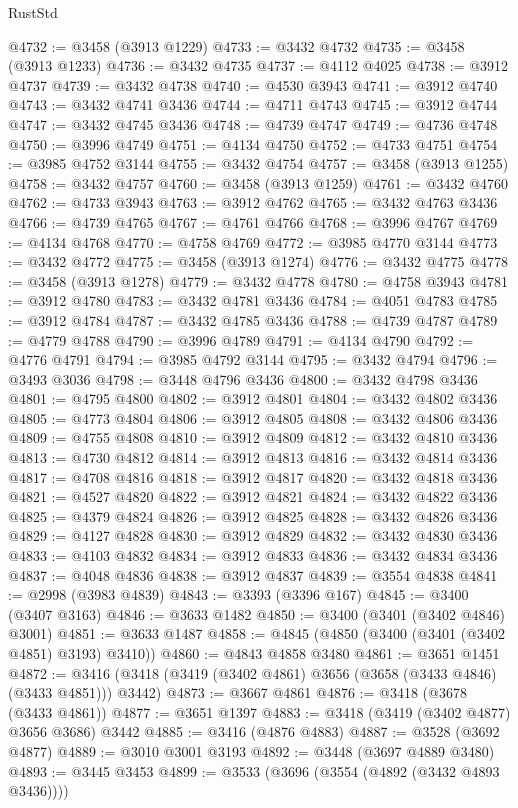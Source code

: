 \begin{lexlean}{RustStd}
\begin{coremodule}
@4732 := @3458 (@3913 @1229)
@4733 := @3432 @4732
@4735 := @3458 (@3913 @1233)
@4736 := @3432 @4735
@4737 := @4112 @4025
@4738 := @3912 @4737
@4739 := @3432 @4738
@4740 := @4530 @3943
@4741 := @3912 @4740
@4743 := @3432 @4741 @3436
@4744 := @4711 @4743
@4745 := @3912 @4744
@4747 := @3432 @4745 @3436
@4748 := @4739 @4747
@4749 := @4736 @4748
@4750 := @3996 @4749
@4751 := @4134 @4750
@4752 := @4733 @4751
@4754 := @3985 @4752 @3144
@4755 := @3432 @4754
@4757 := @3458 (@3913 @1255)
@4758 := @3432 @4757
@4760 := @3458 (@3913 @1259)
@4761 := @3432 @4760
@4762 := @4733 @3943
@4763 := @3912 @4762
@4765 := @3432 @4763 @3436
@4766 := @4739 @4765
@4767 := @4761 @4766
@4768 := @3996 @4767
@4769 := @4134 @4768
@4770 := @4758 @4769
@4772 := @3985 @4770 @3144
@4773 := @3432 @4772
@4775 := @3458 (@3913 @1274)
@4776 := @3432 @4775
@4778 := @3458 (@3913 @1278)
@4779 := @3432 @4778
@4780 := @4758 @3943
@4781 := @3912 @4780
@4783 := @3432 @4781 @3436
@4784 := @4051 @4783
@4785 := @3912 @4784
@4787 := @3432 @4785 @3436
@4788 := @4739 @4787
@4789 := @4779 @4788
@4790 := @3996 @4789
@4791 := @4134 @4790
@4792 := @4776 @4791
@4794 := @3985 @4792 @3144
@4795 := @3432 @4794
@4796 := @3493 @3036
@4798 := @3448 @4796 @3436
@4800 := @3432 @4798 @3436
@4801 := @4795 @4800
@4802 := @3912 @4801
@4804 := @3432 @4802 @3436
@4805 := @4773 @4804
@4806 := @3912 @4805
@4808 := @3432 @4806 @3436
@4809 := @4755 @4808
@4810 := @3912 @4809
@4812 := @3432 @4810 @3436
@4813 := @4730 @4812
@4814 := @3912 @4813
@4816 := @3432 @4814 @3436
@4817 := @4708 @4816
@4818 := @3912 @4817
@4820 := @3432 @4818 @3436
@4821 := @4527 @4820
@4822 := @3912 @4821
@4824 := @3432 @4822 @3436
@4825 := @4379 @4824
@4826 := @3912 @4825
@4828 := @3432 @4826 @3436
@4829 := @4127 @4828
@4830 := @3912 @4829
@4832 := @3432 @4830 @3436
@4833 := @4103 @4832
@4834 := @3912 @4833
@4836 := @3432 @4834 @3436
@4837 := @4048 @4836
@4838 := @3912 @4837
@4839 := @3554 @4838
@4841 := @2998 (@3983 @4839)
@4843 := @3393 (@3396 @167)
@4845 := @3400 (@3407 @3163)
@4846 := @3633 @1482
@4850 := @3400 (@3401 (@3402 @4846) @3001)
@4851 := @3633 @1487
@4858 := @4845 (@4850 (@3400 (@3401 (@3402 @4851) @3193) @3410))
@4860 := @4843 @4858 @3480
@4861 := @3651 @1451
@4872 := @3416 (@3418 (@3419 (@3402 @4861) @3656 (@3658 (@3433 @4846) (@3433 @4851))) @3442)
@4873 := @3667 @4861
@4876 := @3418 (@3678 (@3433 @4861))
@4877 := @3651 @1397
@4883 := @3418 (@3419 (@3402 @4877) @3656 @3686) @3442
@4885 := @3416 (@4876 @4883)
@4887 := @3528 (@3692 @4877)
@4889 := @3010 @3001 @3193
@4892 := @3448 (@3697 @4889 @3480)
@4893 := @3445 @3453
@4899 := @3533 (@3696 (@3554 (@4892 (@3432 @4893 @3436))))

\end{coremodule}
\end{lexlean}
